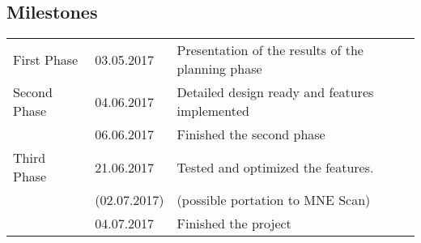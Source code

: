 \subsection{Milestones}
\begin{tabular}{lll}
	First Phase & 03.05.2017 & Presentation of the results of the planning phase\\
	Second Phase & 04.06.2017 & Detailed design ready and features implemented\\
				& 06.06.2017 & Finished the second phase\\
	Third Phase & 21.06.2017 & Tested and optimized the features. \\          
				&(02.07.2017)&(possible portation to MNE Scan)\\
				& 04.07.2017 & Finished the project\\
\end{tabular}

